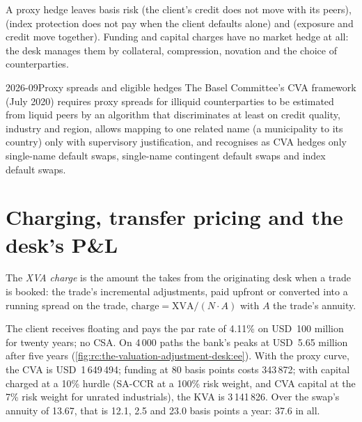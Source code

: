 A proxy hedge leaves basis risk (the client's credit does not move with its peers),
 (index protection does not pay when the client defaults alone) and
 (exposure and credit move together). Funding and capital charges have no market
hedge at all: the desk manages them by collateral, compression, novation and the choice of
counterparties.

\begin{dated}{2026-09}{Proxy spreads and eligible hedges}\label{dat:rc:the-valuation-adjustment-desk:proxy}
The Basel Committee's CVA framework (July 2020) requires proxy spreads for illiquid
counterparties to be estimated from liquid peers by an algorithm that discriminates at least
on credit quality, industry and region, allows mapping to one related name (a municipality
to its country) only with supervisory justification, and recognises as CVA hedges only
single-name default swaps, single-name contingent default swaps and index default swaps.
\end{dated}

\section{Charging, transfer pricing and the desk's P\&L}

\begin{definition}\label{def:rc:the-valuation-adjustment-desk:charge}
The \emph{XVA charge} is the amount the  takes from the
originating desk when a trade is booked: the trade's incremental adjustments, paid upfront or
converted into a running spread on the trade, $\text{charge} = \mathrm{XVA}/(N\cdot A)$ with $A$ the
trade's annuity.
\end{definition}

\begin{example}\label{ex:rc:the-valuation-adjustment-desk:quote}
The client receives floating and pays the par rate of 4.11\% on USD~100 million for twenty
years; no CSA. On 4\,000 paths the bank's  peaks at USD~5.65 million after
five years (\cref{fig:rc:the-valuation-adjustment-desk:ee}). With the proxy curve, the CVA is
USD~1\,649\,494; funding at 80 basis points costs 343\,872; with capital charged at a 10\% hurdle
(SA-CCR at a 100\% risk weight, and CVA capital at the 7\% risk weight for unrated
industrials), the KVA is 3\,141\,826. Over the swap's annuity of 13.67, that is 12.1, 2.5 and 23.0
basis points a year: 37.6 in all.
\end{example}

